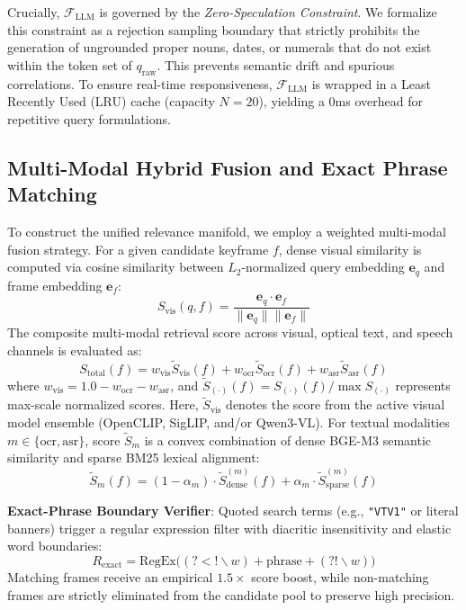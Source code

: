 Crucially, $\mathcal{F}_{\text{LLM}}$ is governed by the \textit{Zero-Speculation Constraint}. We formalize this constraint as a rejection sampling boundary that strictly prohibits the generation of ungrounded proper nouns, dates, or numerals that do not exist within the token set of $q_{\text{raw}}$. This prevents semantic drift and spurious correlations. To ensure real-time responsiveness, $\mathcal{F}_{\text{LLM}}$ is wrapped in a Least Recently Used (LRU) cache (capacity $N=20$), yielding a 0ms overhead for repetitive query formulations.

\subsection{Multi-Modal Hybrid Fusion and Exact Phrase Matching}\label{sec:fusion}

To construct the unified relevance manifold, we employ a weighted multi-modal fusion strategy. For a given candidate keyframe $f$, dense visual similarity is computed via cosine similarity between $L_2$-normalized query embedding $\mathbf{e}_q$ and frame embedding $\mathbf{e}_f$:
\begin{equation}
S_{\text{vis}}(q, f) = \frac{\mathbf{e}_q \cdot \mathbf{e}_f}{\|\mathbf{e}_q\| \|\mathbf{e}_f\|}
\end{equation}
The composite multi-modal retrieval score across visual, optical text, and speech channels is evaluated as:
\begin{equation}
S_{\text{total}}(f) = w_{\text{vis}} \tilde{S}_{\text{vis}}(f) + w_{\text{ocr}} \tilde{S}_{\text{ocr}}(f) + w_{\text{asr}} \tilde{S}_{\text{asr}}(f)
\end{equation}
where $w_{\text{vis}} = 1.0 - w_{\text{ocr}} - w_{\text{asr}}$, and $\tilde{S}_{(\cdot)}(f) = S_{(\cdot)}(f) / \max S_{(\cdot)}$ represents max-scale normalized scores. Here, $\tilde{S}_{\text{vis}}$ denotes the score from the active visual model ensemble (OpenCLIP, SigLIP, and/or Qwen3-VL). For textual modalities $m \in \{\text{ocr}, \text{asr}\}$, score $\tilde{S}_m$ is a convex combination of dense BGE-M3 semantic similarity and sparse BM25 lexical alignment:
\begin{equation}
\tilde{S}_m(f) = (1 - \alpha_m) \cdot \tilde{S}_{\text{dense}}^{(m)}(f) + \alpha_m \cdot \tilde{S}_{\text{sparse}}^{(m)}(f)
\end{equation}

\textbf{Exact-Phrase Boundary Verifier}: Quoted search terms (e.g., \texttt{"VTV1"} or literal banners) trigger a regular expression filter with diacritic insensitivity and elastic word boundaries:
\begin{equation}
R_{\text{exact}} = \text{RegEx}\big((?<!\backslash w) + \text{phrase} + (?!\backslash w)\big)
\end{equation}
Matching frames receive an empirical $1.5\times$ score boost, while non-matching frames are strictly eliminated from the candidate pool to preserve high precision.

